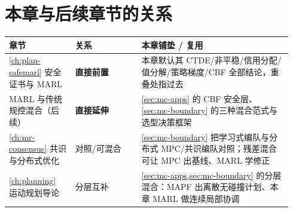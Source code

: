 \section*{本章与后续章节的关系}
\begin{table}[H]\centering\small
\begin{tabular}{p{0.22\linewidth}p{0.22\linewidth}p{0.50\linewidth}}
\toprule
章节 & 关系 & 本章铺垫 / 复用 \\
\midrule
\cref{ch:plan-safemarl} 安全证书与 MARL & \textbf{直接前置} & 本章默认其 CTDE/非平稳/信用分配/值分解/策略梯度/CBF 全部结论，重叠处指过去 \\
MARL 与传统规控混合（后续） & \textbf{直接延伸} & \cref{sec:mc-apps} 的 CBF 安全层、\cref{sec:mc-boundary} 的三种混合范式与选型决策框架 \\
\cref{ch:mr-consensus} 共识与分布式优化 & 对照/可混合 & \cref{sec:mc-boundary} 把学习式编队与分布式 MPC/共识编队对照；残差混合可让 MPC 出基线、MARL 学修正 \\
\cref{ch:planning} 运动规划导论 & 分层互补 & \cref{sec:mc-apps,sec:mc-boundary} 的分层混合：MAPF 出离散无碰撞计划、本章 MARL 做连续局部协调 \\
\bottomrule
\end{tabular}
\end{table}

